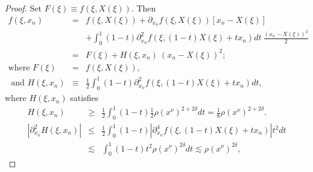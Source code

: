 \documentclass{amsart}
\theoremstyle{plain}
\numberwithin{equation}{section}
\begin{document}
\begin{proof}
Set $F\left( \xi \right) \equiv f\left( \xi ,X\left( \xi \right) \right) $.
Then%
\begin{eqnarray*}
f\left( \xi ,x_{n}\right) &=&f\left( \xi ,X\left( \xi \right) \right)
+\partial _{x_{n}}f\left( \xi ,X\left( \xi \right) \right) \left[
x_{n}-X\left( \xi \right) \right] \\
&&+\int_{0}^{1}\left( 1-t\right) \partial _{x_{n}}^{2}f\left( \xi ,\left(
1-t\right) X\left( \xi \right) +tx_{n}\right) dt\ \frac{\left( x_{n}-X\left(
\xi \right) \right) ^{2}}{2} \\
&=&F\left( \xi \right) +H\left( \xi ,x_{n}\right) \ \left( x_{n}-X\left( \xi
\right) \right) ^{2}; \\
\text{where }F\left( \xi \right) &=&f\left( \xi ,X\left( \xi \right) \right)
, \\
\text{ and }H\left( \xi ,x_{n}\right) &\equiv &\frac{1}{2}\int_{0}^{1}\left(
1-t\right) \partial _{x_{n}}^{2}f\left( \xi ,\left( 1-t\right) X\left( \xi
\right) +tx_{n}\right) dt,
\end{eqnarray*}%
where $H\left( \xi ,x_{n}\right) $ satisfies%
\begin{eqnarray*}
H\left( \xi ,x_{n}\right) &\geq &\frac{1}{2}\int_{0}^{1}\left( 1-t\right) 
\frac{1}{2}\rho \left( x^{\nu }\right) ^{2+2\delta }dt=\frac{1}{8}\rho
\left( x^{\nu }\right) ^{2+2\delta }. \\
\left\vert \partial _{x_{n}}^{2}H\left( \xi ,x_{n}\right) \right\vert &\leq &%
\frac{1}{2}\int_{0}^{1}\left( 1-t\right) \left\vert \partial
_{x_{n}}^{4}f\left( \xi ,\left( 1-t\right) X\left( \xi \right)
+tx_{n}\right) \right\vert t^{2}dt \\
&\lesssim &\int_{0}^{1}\left( 1-t\right) t^{2}\rho \left( x^{\nu }\right)
^{2\delta }dt\lesssim \rho \left( x^{\nu }\right) ^{2\delta },
\end{eqnarray*}


\end{proof}
\end{document}
